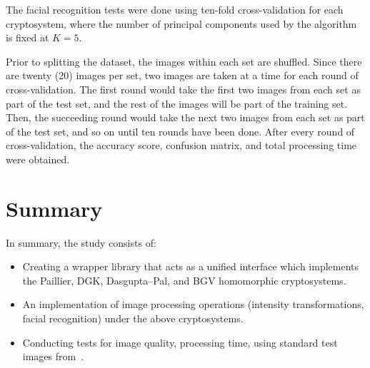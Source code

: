The facial recognition tests were done using ten-fold cross-validation for each cryptosystem, where the number of principal components used by the algorithm is fixed at $K=5$. 

Prior to splitting the dataset, the images within each set are shuffled. Since there are twenty (20) images per set, two images are taken at a time for each round of cross-validation. The first round would take the first two images from each set as part of the test set, and the rest of the images will be part of the training set. Then, the succeeding round would take the next two images from each set as part of the test set, and so on until ten rounds have been done. After every round of cross-validation, the accuracy score, confusion matrix, and total processing time were obtained. 

\section{Summary}
In summary, the study consists of:
\begin{itemize}
	\item Creating a wrapper library that acts as a unified interface which implements the Paillier, DGK, Dasgupta--Pal, and BGV homomorphic cryptosystems.
	\item An implementation of image processing operations (intensity transformations, facial recognition) under the above cryptosystems.
	\item Conducting tests for image quality, processing time, using standard test images from~\cite{gonzalez_image_nodate}.
\end{itemize}

